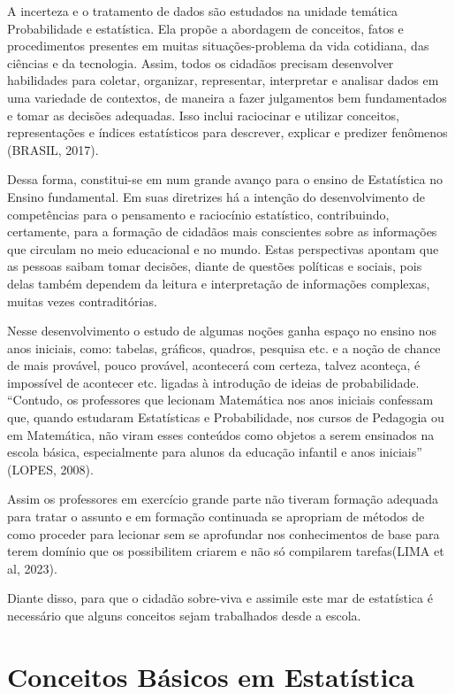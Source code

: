 A incerteza e o tratamento de dados são estudados na unidade temática Probabilidade e estatística. Ela propõe a abordagem de conceitos, fatos e procedimentos presentes em muitas situações-problema da vida cotidiana, das ciências e da tecnologia. Assim, todos os cidadãos precisam desenvolver habilidades para coletar, organizar, representar, interpretar e analisar dados em uma variedade de contextos, de maneira a fazer julgamentos bem fundamentados e tomar as decisões adequadas. Isso inclui raciocinar e utilizar conceitos, representações e índices estatísticos para descrever, explicar e predizer fenômenos (BRASIL, 2017).\vskip0.3cm


Dessa forma, constitui-se em num grande avanço para o ensino de Estatística no Ensino fundamental. Em suas diretrizes há a intenção do desenvolvimento de competências para o pensamento e raciocínio estatístico, contribuindo, certamente, para a formação de cidadãos mais conscientes sobre as informações que circulam no meio educacional e no mundo. Estas perspectivas apontam que as pessoas saibam tomar decisões, diante de questões políticas e sociais, pois delas também dependem da leitura e interpretação de informações complexas, muitas vezes contraditórias.\vskip0.3cm

\newpage
Nesse desenvolvimento o estudo de algumas noções ganha espaço no ensino nos anos iniciais, como: tabelas, gráficos, quadros, pesquisa etc. e a noção de chance de mais provável, pouco provável, acontecerá com certeza, talvez aconteça, é impossível de acontecer etc. ligadas à introdução de ideias de probabilidade. “Contudo, os professores que lecionam Matemática nos anos iniciais confessam que, quando estudaram Estatísticas e Probabilidade, nos cursos de Pedagogia ou em Matemática, não viram esses conteúdos como objetos a serem ensinados na escola básica, especialmente para alunos da educação infantil e anos iniciais” (LOPES, 2008). \vskip0.3cm


Assim os professores em exercício grande parte não tiveram formação adequada para tratar o assunto e em formação continuada se apropriam de métodos de como proceder para lecionar sem se aprofundar nos conhecimentos de base para terem domínio que os possibilitem criarem e não só compilarem tarefas(LIMA et al, 2023). \vskip0.3cm


Diante disso, para que o cidadão sobre-viva e assimile este mar de estatística é necessário que alguns conceitos sejam trabalhados desde a escola.


\section{Conceitos Básicos em Estatística}
